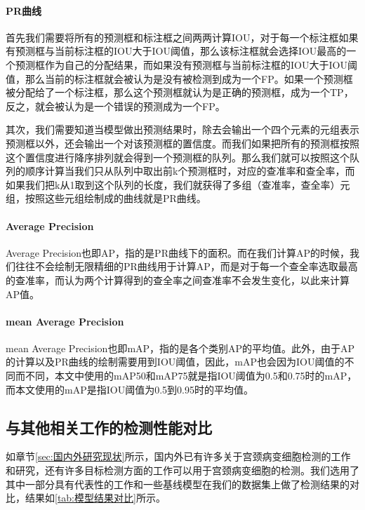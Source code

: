 \paragraph{PR曲线}
\par 首先我们需要将所有的预测框和标注框之间两两计算IOU，对于每一个标注框如果有预测框与当前标注框的IOU大于IOU阈值，那么该标注框就会选择IOU最高的一个预测框作为自己的分配结果，而如果没有预测框与当前标注框的IOU大于IOU阈值，那么当前的标注框就会被认为是没有被检测到成为一个FP。如果一个预测框被分配给了一个标注框，那么这个预测框就认为是正确的预测框，成为一个TP，反之，就会被认为是一个错误的预测成为一个FP。
\par 其次，我们需要知道当模型做出预测结果时，除去会输出一个四个元素的元组表示预测框以外，还会输出一个对该预测框的置信度。而我们如果把所有的预测框按照这个置信度进行降序排列就会得到一个预测框的队列。那么我们就可以按照这个队列的顺序计算当我们只从队列中取出前k个预测框时，对应的查准率和查全率，而如果我们把k从1取到这个队列的长度，我们就获得了多组（查准率，查全率）元组，按照这些元组绘制成的曲线就是PR曲线。

\paragraph{Average Precision}
\par Average Precision也即AP，指的是PR曲线下的面积。而在我们计算AP的时候，我们往往不会绘制无限精细的PR曲线用于计算AP，而是对于每一个查全率选取最高的查准率，而认为两个计算得到的查全率之间查准率不会发生变化，以此来计算AP值。

\paragraph{mean Average Precision}
\par mean Average Precision也即mAP，指的是各个类别AP的平均值。此外，由于AP的计算以及PR曲线的绘制需要用到IOU阈值，因此，mAP也会因为IOU阈值的不同而不同，本文中使用的mAP50和mAP75就是指IOU阈值为0.5和0.75时的mAP，而本文使用的mAP是指IOU阈值为0.5到0.95时的平均值。

\subsection{与其他相关工作的检测性能对比}
\par 如章节\ref{sec:国内外研究现状}所示，国内外已有许多关于宫颈病变细胞检测的工作和研究，还有许多目标检测方面的工作可以用于宫颈病变细胞的检测。我们选用了其中一部分具有代表性的工作和一些基线模型在我们的数据集上做了检测结果的对比，结果如\ref{tab:模型结果对比}所示。

